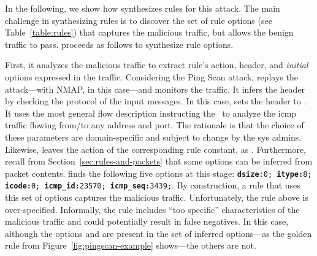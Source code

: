 \documentclass[conference]{IEEEtran}
\begin{document}

In the following, we show how \tname{} synthesizes rules for this
attack. The main challenge in synthesizing rules is to discover the
set of rule options (see Table~\ref{table:rules}) that captures the
malicious traffic, but allows the benign traffic to pass. \tname{}
proceeds as follows to synthesize rule options.


First, it analyzes the malicious traffic to extract rule's action,
header, and \emph{initial} options expressed in the
traffic. Considering the Ping Scan attack, \tname{} replays the
attack---with NMAP, in this case---and monitors the traffic.  It
infers the header by checking the protocol of the input messages. In
this case, \tname{} sets the header to . It uses the most general flow description instructing the
\nids\ to analyze the icmp traffic flowing from/to any address and
port.  The rationale is that the choice of these parameters are
domain-specific and subject to change by the sys admins. Likewise,
\tname{} leaves the action of the corresponding rule constant, as
. Furthermore, recall from
Section~\ref{sec:rules-and-packets} that some options can be inferred
from packet contents. \tname{} finds the following five options at
this stage: {\scriptsize{\texttt{\textbf{dsize}:0; \textbf{itype:}8;
      \textbf{icode:}0; \textbf{icmp\_id:}23570;
      \textbf{icmp\_seq:}3439;}}}.  By construction, a rule that uses
this set of options captures the malicious traffic. Unfortunately, the
rule above is over-specified. Informally, the rule includes ``too
specific'' characteristics of the malicious traffic and could
potentially result in false negatives. In this case, although the
options  and  are present in the set
of inferred options---as the golden rule from
Figure~\ref{fig:pingscan-example} shows---the others are not.


\end{document}
